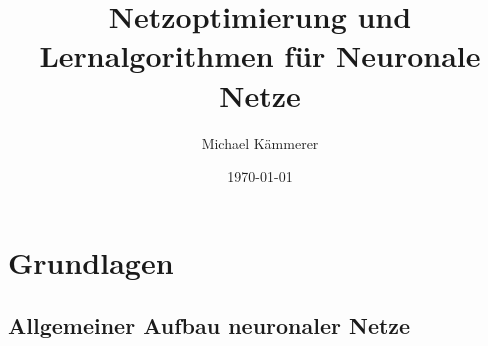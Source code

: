 \documentclass[12pt,titlepage]{beamer}
\begin{document}
	\title{Netzoptimierung und Lernalgorithmen für Neuronale Netze}
	\author{Michael Kämmerer}
	\date{\today}
	\institute{}
	\begin{frame}
		\maketitle
	\end{frame}
	\section{Grundlagen}
	\subsection{Allgemeiner Aufbau neuronaler Netze}
		
\end{document}
